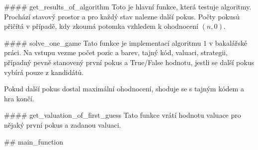 \documentclass[12pt,a4paper]{article}
\begin{document}
#### get_results_of_algorithm
Toto je hlavní funkce, která testuje algoritmy. Prochází stavový prostor a pro každý stav nalezne další pokus. Počty pokusů přičítá v případě, kdy zkoumá potomka vzhledem k ohodnocení $(n ,0)$.

#### solve_one_game
Tato funkce je implementací algoritmu $1$ v bakalářské práci. Na vstupu vezme počet pozic a barev, tajný kód, valuaci, strategii, případný pevně stanovený první pokus a True/False hodnotu, jestli se další pokus vybírá pouze z kandidátů. 

Pokud další pokus dostal maximální ohodnocení, shoduje se s tajným kódem a hra končí. 


#### get_valuation_of_first_guess
Tato funkce vrátí hodnotu valuace pro nějaký první pokus a zadanou valuaci. 

## main_function
\end{document}
